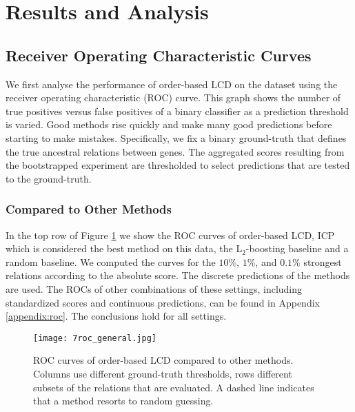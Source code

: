 \newpage
\section{Results and Analysis}
\label{chapter:analysis}





\subsection{Receiver Operating Characteristic Curves}

We first analyse the performance of order-based LCD on the \citet{kemmeren2014large} dataset using the receiver operating characteristic (ROC) curve. This graph shows the number of true positives versus false positives of a binary classifier as a prediction threshold is varied. Good methods rise quickly and make many good predictions before starting to make mistakes. Specifically, we fix a binary ground-truth that defines the true ancestral relations between genes. The aggregated scores resulting from the bootstrapped experiment are thresholded to select predictions that are tested to the ground-truth.

\subsubsection{Compared to Other Methods}

In the top row of Figure \ref{fig:7:rocgen} we show the ROC curves of order-based LCD, ICP which is considered the best method on this data, the L$_2$-boosting baseline and a random baseline. We computed the curves for the $10\%$, $1\%$, and $0.1\%$ strongest relations according to the absolute score. The discrete predictions of the methods are used. The ROCs of other combinations of these settings, including standardized scores and continuous predictions, can be found in Appendix \ref{appendix:roc}. The conclusions hold for all settings.

\begin{figure}[h]
    \centering
    \texttt{[image: 7roc\_general.jpg]}
    \caption{ROC curves of order-based LCD compared to other methods. Columns use different ground-truth thresholds, rows different subsets of the relations that are evaluated. A dashed line indicates that a method resorts to random guessing.}
    \label{fig:7:rocgen}
\end{figure}

